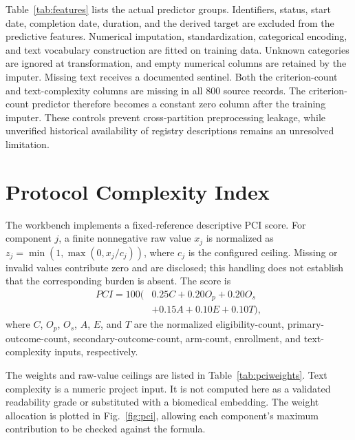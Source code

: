 \documentclass[10pt,letterpaper,twocolumn]{article}
\begin{document}
Table~\ref{tab:features} lists the actual predictor groups. Identifiers, status, start date, completion date, duration, and the derived target are excluded from the predictive features. Numerical imputation, standardization, categorical encoding, and text vocabulary construction are fitted on training data. Unknown categories are ignored at transformation, and empty numerical columns are retained by the imputer. Missing text receives a documented sentinel. Both the criterion-count and text-complexity columns are missing in all 800 source records. The criterion-count predictor therefore becomes a constant zero column after the training imputer. These controls prevent cross-partition preprocessing leakage, while unverified historical availability of registry descriptions remains an unresolved limitation.

\section{Protocol Complexity Index}

The workbench implements a fixed-reference descriptive PCI score. For component $j$, a finite nonnegative raw value $x_j$ is normalized as $z_j=\min(1,\max(0,x_j/c_j))$, where $c_j$ is the configured ceiling. Missing or invalid values contribute zero and are disclosed; this handling does not establish that the corresponding burden is absent. The score is
\begin{equation}
\begin{split}
PCI=100(&0.25C+0.20O_p+0.20O_s\\
       &+0.15A+0.10E+0.10T),
\end{split}
\label{eq:pci}
\end{equation}
where $C$, $O_p$, $O_s$, $A$, $E$, and $T$ are the normalized eligibility-count, primary-outcome-count, secondary-outcome-count, arm-count, enrollment, and text-complexity inputs, respectively.

The weights and raw-value ceilings are listed in Table~\ref{tab:pciweights}. Text complexity is a numeric project input. It is not computed here as a validated readability grade or substituted with a biomedical embedding. The weight allocation is plotted in Fig.~\ref{fig:pci}, allowing each component's maximum contribution to be checked against the formula.
\end{document}
